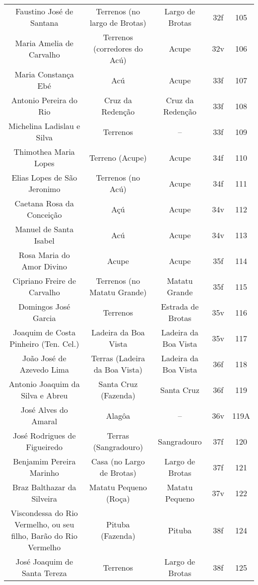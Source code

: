 \begin{table}[!htp]
{\begin{tiny}
\begin{tabular}{ccccc}
Faustino José de Santana							&Terrenos (no largo de Brotas)		&Largo de Brotas			&32f			&105			&\\
Maria Amelia de Carvalho							&Terrenos (corredores do Acú)		&Acupe					&32v			&106			&\\
Maria Constança Ebé								&Acú					&Acupe					&33f			&107			&\\
Antonio Pereira do Rio								&Cruz da Redenção			&Cruz da Redenção			&33f			&108			&\\
Michelina Ladislau e Silva							&Terrenos				&--					&33f			&109			&\\
Thimothea Maria Lopes								&Terreno (Acupe)			&Acupe					&34f			&110			&\\
Elias Lopes de São Jeronimo							&Terrenos (no Acú)			&Acupe					&34f			&111			&\\
Caetana Rosa da Conceição							&Açú					&Acupe					&34v			&112			&\\
Manuel de Santa Isabel								&Acú					&Acupe					&34v			&113			&\\
Rosa Maria do Amor Divino							&Acupe					&Acupe					&35f			&114			&\\
Cipriano Freire de Carvalho							&Terrenos (no Matatu Grande)		&Matatu Grande				&35f			&115			&\\
Domingos José Garcia								&Terrenos				&Estrada de Brotas			&35v			&116			&\\
Joaquim de Costa Pinheiro (Ten. Cel.)						&Ladeira da Boa Vista			&Ladeira da Boa Vista			&35v			&117			&\\
João José de Azevedo Lima							&Terras (Ladeira da Boa Vista)		&Ladeira da Boa Vista			&36f			&118			&\\
Antonio Joaquim da Silva e Abreu						&Santa Cruz (Fazenda)			&Santa Cruz				&36f			&119			&\\
José Alves do Amaral								&Alagôa					&--					&36v			&119A			&\\
José Rodrigues de Figueiredo							&Terras (Sangradouro)			&Sangradouro				&37f			&120			&\\
Benjamim Pereira Marinho							&Casa (no Largo de Brotas)		&Largo de Brotas			&37f			&121			&\\
Braz Balthazar da Silveira							&Matatu Pequeno (Roça)			&Matatu Pequeno				&37v			&122			&\\
Viscondessa do Rio Vermelho, ou seu filho, Barão do Rio Vermelho		&Pituba (Fazenda)			&Pituba					&38f			&124			&\\
José Joaquim de Santa Tereza							&Terrenos				&Largo de Brotas			&38f			&125			&\\

\end{tabular}
\end{tiny}}
\end{table}
